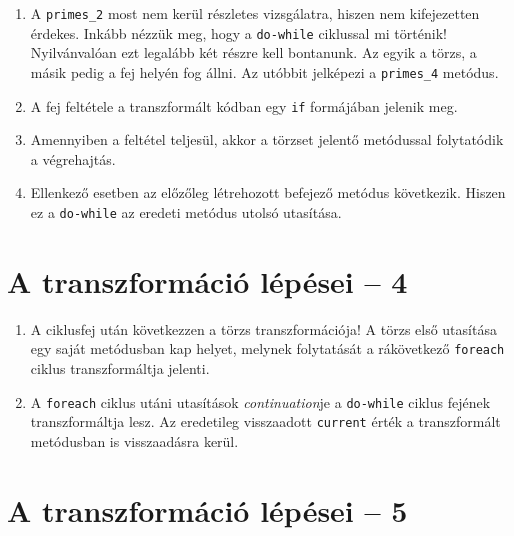 \documentclass[12pt, a4paper]{article}
\begin{document}
\begin{enumerate}
    \item
    A \texttt{primes\_2} most nem kerül részletes vizsgálatra, hiszen nem kifejezetten érdekes. Inkább nézzük meg, hogy a \texttt{do-while} ciklussal mi történik! Nyilvánvalóan ezt legalább két részre kell bontanunk. Az egyik a törzs, a másik pedig a fej helyén fog állni. Az utóbbit jelképezi a \texttt{primes\_4} metódus.
    \item
    A fej feltétele a transzformált kódban egy \texttt{if} formájában jelenik meg.
    \item
    Amennyiben a feltétel teljesül, akkor a törzset jelentő metódussal folytatódik a végrehajtás.
    \item
    Ellenkező esetben az előzőleg létrehozott befejező metódus következik. Hiszen ez a \texttt{do-while} az eredeti metódus utolsó utasítása.
\end{enumerate}

\section{A transzformáció lépései -- 4}

\begin{enumerate}
    \item
    A ciklusfej után következzen a törzs transzformációja! A törzs első utasítása egy saját metódusban kap helyet, melynek folytatását a rákövetkező \texttt{foreach} ciklus transzformáltja jelenti.
    \item
    A \texttt{foreach} ciklus utáni utasítások \textit{continuation}je a \texttt{do-while} ciklus fejének transzformáltja lesz. Az eredetileg visszaadott \texttt{current} érték a transzformált metódusban is visszaadásra kerül.
\end{enumerate}

\section{A transzformáció lépései -- 5}
\end{document}
